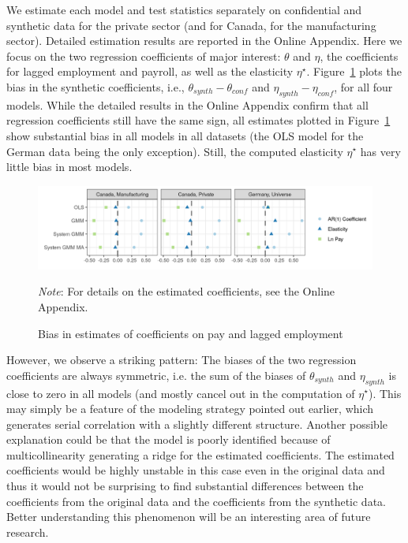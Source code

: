 \documentclass[10pt,twoside]{article}
\begin{document}
We estimate each model and test statistics separately on confidential and synthetic data for the private sector (and for Canada, for the manufacturing sector). Detailed estimation results are reported in the Online Appendix. Here we  focus on the two regression coefficients of major interest: $\theta$ and $\eta$, the coefficients for lagged employment and payroll, as well as the elasticity $\eta^\star$. Figure~\ref{fig:estimates3} plots the bias in the synthetic coefficients, i.e., $\theta_{synth}-\theta_{conf}$ and $\eta_{synth}-\eta_{conf}$, for all four models. While the detailed results in the Online Appendix confirm that all regression coefficients still have the same sign, all estimates plotted in Figure~\ref{fig:estimates3} show substantial bias in all models in all datasets (the OLS model for the German data being the only exception). Still, the computed elasticity $\eta^\star$ has very little bias in most models.


\begin{figure} [H]
\centering
\includegraphics[width=\linewidth]{r-graphs/fig_estimates3.png}
\caption{Bias in estimates of coefficients on  pay and lagged employment\label{fig:estimates3}} 
\begin{minipage}{0.70\linewidth}
{\footnotesize \textit{Note}: For details on the estimated coefficients, see the Online Appendix. \par}
\end{minipage}
\end{figure}
 
However, we observe a striking pattern: The biases of the two regression coefficients are always symmetric, i.e. the sum of the biases of $\theta_{synth}$ and $\eta_{synth}$ is close to zero in all models (and mostly cancel out in the computation of $\eta^\star$). 
This may simply be a feature of the modeling strategy pointed out earlier, which generates serial correlation with a slightly different structure. Another possible explanation could be that the model is poorly identified because of multicollinearity generating a ridge for the estimated coefficients. The estimated coefficients would be highly unstable in this case even in the original data and thus it would not be surprising to find substantial differences between the coefficients from the original data and the coefficients from the synthetic data. Better understanding this phenomenon will be an interesting area of future research.
\end{document}
